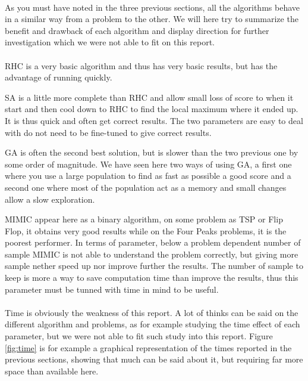 \documentclass[twocolumn,a4paper,10pt]{article}
\begin{document}
\paragraph{}

As you must have noted in the three previous sections, all the algorithms
behave in a similar way from a problem to the other. We will here
try to summarize the benefit and drawback of each algorithm and display
direction for further investigation which we were not able to fit
on this report.

\paragraph{}

RHC is a very basic algorithm and thus has very basic results, but
has the advantage of running quickly.

SA is a little more complete than RHC and allow small loss of score
to when it start and then cool down to RHC to find the local maximum
where it ended up. It is thus quick and often get correct results.
The two parameters are easy to deal with do not need to be fine-tuned
to give correct results.

GA is often the second best solution, but is slower than the two previous
one by some order of magnitude. We have seen here two ways of using
GA, a first one where you use a large population to find as fast as
possible a good score and a second one where most of the population
act as a memory and small changes allow a slow exploration.

MIMIC appear here as a binary algorithm, on some problem as TSP or
Flip Flop, it obtains very good results while on the Four Peaks problems,
it is the poorest performer. In terms of parameter, below a problem
dependent number of sample MIMIC is not able to understand the problem
correctly, but giving more sample nether speed up nor improve further
the results. The number of sample to keep is more a way to save computation
time than improve the results, thus this parameter must be tunned
with time in mind to be useful.

\paragraph{}

Time is obviously the weakness of this report. A lot of thinks can
be said on the different algorithm and problems, as for example studying
the time effect of each parameter, but we were not able to fit such
study into this report. Figure \ref{fig:time} is for example a graphical
representation of the times reported in the previous sections, showing
that much can be said about it, but requiring far more space than
available here.
\end{document}
